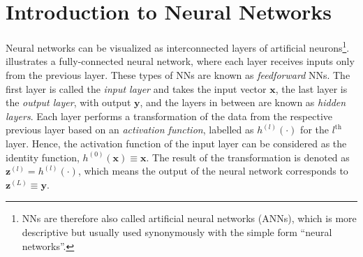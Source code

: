 \section{Introduction to Neural Networks}
\label{sec:intro-neural-nets}
Neural networks can be visualized as interconnected layers of artificial neurons\footnote{ NNs are therefore also called artificial neural networks (ANNs), which is more descriptive but usually used synonymously with the simple form ``neural networks''.}.  illustrates a fully-connected neural network, where each layer receives inputs only from the previous layer. These types of NNs are known as \emph{feedforward} NNs.
The first layer is called the \emph{input layer} and takes the input vector $\pmb{x}$, the last layer is the \emph{output layer}, with output $\pmb{y}$, and the layers in between are known as \emph{hidden layers}. 
Each layer performs a transformation of the data from the respective previous layer based on an \emph{activation function}, labelled as $h^{(l)}(\cdot)$ for the $l^\text{th}$ layer. Hence, the activation function of the input layer can be considered as the identity function, $h^{(0)}(\pmb{x}) \equiv \pmb{x}$. 
The result of the transformation is denoted as $\pmb{z}^{(l)} = h^{(l)}(\cdot)$, which means the output of the neural network corresponds to $ \pmb{z}^{(L)} \equiv \pmb{y}$.

